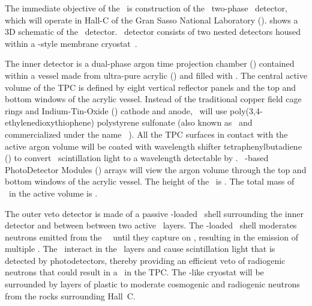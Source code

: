 
The immediate objective of the \GADMC\ is construction of the \DSks\ two-phase \LAr\ detector, which will operate in Hall-C of the Gran Sasso National Laboratory (\LNGS).   shows a 3D schematic of the \DSks\ detector. \DSks\ detector consists of two nested detectors housed within a \pDUNE-style membrane cryostat~\cite{Abi:2017wp,Acciarri:2016wz}.  

The inner detector is a dual-phase argon time projection chamber (\LArTPC) contained within a vessel made from ultra-pure  acrylic (\PMMA) and filled with \UAr.  The central active volume of the TPC is defined by eight vertical reflector panels and the top and bottom windows of the acrylic vessel. Instead of the traditional copper field cage rings and Indium-Tin-Oxide (\ITO) cathode and anode, \DSks\ will use poly(3,4-ethylenedioxythiophene) polystyrene sulfonate (also known as \PEDOT\ and commercialized under the name \Clevios~\cite{HeraeusDeutschlandGmbHandCOKg:2019wt}). All the TPC surfaces in contact with the active argon volume will be coated with  wavelength shifter tetraphenylbutadiene (\TPB) to convert \LAr\ scintillation light to a wavelength detectable by \SiPMs.  \DSkTilesNumber\ \SiPM-based PhotoDetector Modules (\DSkPdm) arrays will view the argon volume through the top and bottom windows of the acrylic vessel. The height of the \TPC\ is \DSkTPCHeight. The total mass of \LAr\ in the active volume is \DSkActiveMass.

The outer veto detector is made of a passive -loaded \PMMA\ shell surrounding the inner detector and between between two active \AAr\ layers.  The -loaded \PMMA\ shell moderates neutrons emitted from the \LAr\ \TPC\ until they capture on , resulting in the emission of multiple \grs.  The \grs\ interact in the \AAr\ layers and cause scintillation light that is detected by photodetectors, thereby providing an efficient veto of radiogenic neutrons that could result in a \NR\ in the TPC.  The \pDUNE-like cryostat will be surrounded by layers of plastic to moderate cosmogenic and radiogenic neutrons from the rocks surrounding Hall~C.


